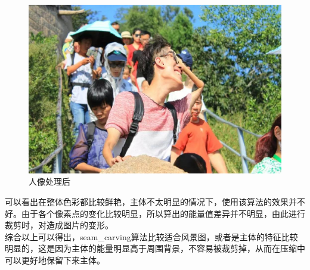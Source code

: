 \documentclass[UTF8]{ctexart}
\begin{document}
\begin{figure}[H]
    \centering
    \includegraphics[width=1\textwidth]{img/output-3.jpg}
    \caption{人像处理后}
    \label{output-3}
\end{figure}
可以看出在整体色彩都比较鲜艳，主体不太明显的情况下，使用该算法的效果并不好。由于各个像素点的变化比较明显，所以算出的能量值差异并不明显，由此进行裁剪时，对造成图片的变形。\\

综合以上可以得出，seam\_carving算法比较适合风景图，或者是主体的特征比较明显的，这是因为主体的能量明显高于周围背景，不容易被裁剪掉，从而在压缩中可以更好地保留下来主体。
\end{document}
